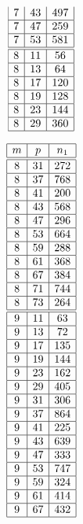 \documentclass[a4paper, 10pt]{article}
\begin{document}
\begin{center}
\begin{minipage}[t]{.23\textwidth}
\begin{displaymath}
\begin{array}{|c|c|c|}
7 & 43 & 497 \\ \hline
7 & 47 & 259 \\ \hline
7 & 53 & 581 \\ \hline
\hline
8 & 11 & 56 \\ \hline
8 & 13 & 64 \\ \hline
8 & 17 & 120 \\ \hline
8 & 19 & 128 \\ \hline
8 & 23 & 144 \\ \hline
8 & 29 & 360 \\ \hline
\end{array}
\end{displaymath}
\end{minipage}
\begin{minipage}[t]{.23\textwidth}
\begin{displaymath}
\begin{array}{|c|c|c|}
\hline
m & p & n_{1} \\ \hline
\hline
8 & 31 & 272 \\ \hline
8 & 37 & 768 \\ \hline
8 & 41 & 200 \\ \hline
8 & 43 & 568 \\ \hline
8 & 47 & 296 \\ \hline
8 & 53 & 664 \\ \hline
8 & 59 & 288 \\ \hline
8 & 61 & 368 \\ \hline
8 & 67 & 384 \\ \hline
8 & 71 & 744 \\ \hline
8 & 73 & 264 \\ \hline
\hline
9 & 11 & 63 \\ \hline
9 & 13 & 72 \\ \hline
9 & 17 & 135 \\ \hline
9 & 19 & 144 \\ \hline
9 & 23 & 162 \\ \hline
9 & 29 & 405 \\ \hline
9 & 31 & 306 \\ \hline
9 & 37 & 864 \\ \hline
9 & 41 & 225 \\ \hline
9 & 43 & 639 \\ \hline
9 & 47 & 333 \\ \hline
9 & 53 & 747 \\ \hline
9 & 59 & 324 \\ \hline
9 & 61 & 414 \\ \hline
9 & 67 & 432 \\ \hline

\end{array}
\end{displaymath}
\end{minipage}
\end{center}
\end{document}
